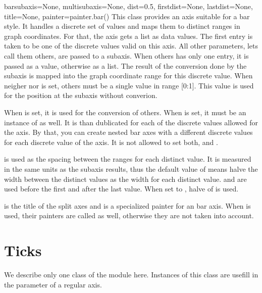 \begin{classdesc}{bar}{subaxis=None, multisubaxis=None,
                       dist=0.5, firstdist=None, lastdist=None,
                       title=None, painter=painter.bar()}
  This class provides an axis suitable for a bar style. It handles a
  discrete set of values and maps them to distinct ranges in graph
  coordinates. For that, the axis gets a list as data values. The
  first entry is taken to be one of the discrete values valid on this
  axis. All other parameters, lets call them others, are passed to a
  subaxis. When others has only one entry, it is passed as a value,
  otherwise as a list. The result of the conversion done by the
  subaxis is mapped into the graph coordinate range for this discrete
  value. When neigher  nor  is set,
  others must be a single value in range [0:1]. This value is used for
  the position at the subaxis without converion.

  When  is set, it is used for the conversion of others.
  When  is set, it must be an instance of 
  as well. It is than dublicated for each of the discrete values
  allowed for the axis. By that, you can create nested bar axes with
  a different discrete values for each discrete value of the axis. It
  is not allowed to set both,  and .

   is used as the spacing between the ranges for each
  distinct value. It is measured in the same units as the subaxis
  results, thus the default value of  means halve the width
  between the distinct values as the width for each distinct value.
   and  are used before the first and
  after the last value. When set to , halve of 
  is used.

   is the title of the split axes and  is a
  specialized painter for an bar axis. When  is
  used, their painters are called as well, otherwise they are not
  taken into account.
\end{classdesc}

\section{Ticks}


We describe only one class of the module 
here. Instances of this class are usefill in the 
parameter of a regular axis.

